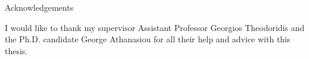 \begin{center}
{\LARGE Acknowledgements}\\[1cm]
\end{center}

I would like to thank my supervisor Assistant Professor Georgios Theodoridis and the Ph.D. candidate George Athanasiou for all their help and advice with this thesis.
